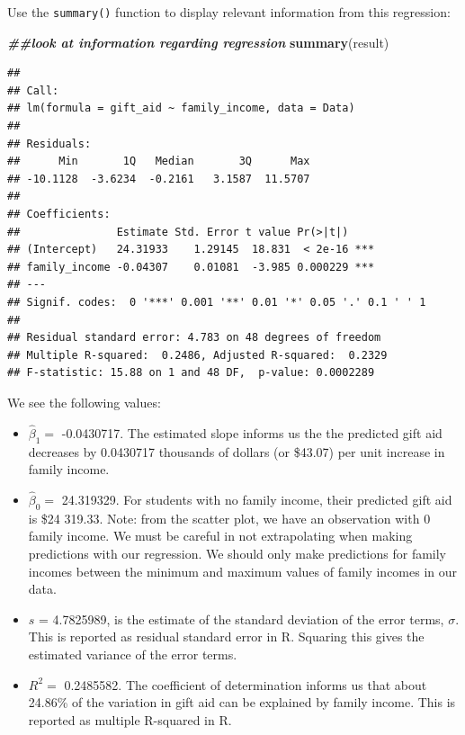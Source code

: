 \documentclass[
]{book}
\newenvironment{Shaded}{\begin{snugshade}}{\end{snugshade}}
\newcommand{\DocumentationTok}[1]{\textcolor[rgb]{0.56,0.35,0.01}{\textbf{\textit{#1}}}}
\newcommand{\FunctionTok}[1]{\textcolor[rgb]{0.13,0.29,0.53}{\textbf{#1}}}
\newcommand{\NormalTok}[1]{#1}
\providecommand{\tightlist}{%
  \setlength{\itemsep}{0pt}\setlength{\parskip}{0pt}}
\begin{document}
Use the \texttt{summary()} function to display relevant information from this regression:

\begin{Shaded}
\begin{Highlighting}[]
\DocumentationTok{\#\#look at information regarding regression}
\FunctionTok{summary}\NormalTok{(result)}
\end{Highlighting}
\end{Shaded}

\begin{verbatim}
## 
## Call:
## lm(formula = gift_aid ~ family_income, data = Data)
## 
## Residuals:
##      Min       1Q   Median       3Q      Max 
## -10.1128  -3.6234  -0.2161   3.1587  11.5707 
## 
## Coefficients:
##               Estimate Std. Error t value Pr(>|t|)    
## (Intercept)   24.31933    1.29145  18.831  < 2e-16 ***
## family_income -0.04307    0.01081  -3.985 0.000229 ***
## ---
## Signif. codes:  0 '***' 0.001 '**' 0.01 '*' 0.05 '.' 0.1 ' ' 1
## 
## Residual standard error: 4.783 on 48 degrees of freedom
## Multiple R-squared:  0.2486, Adjusted R-squared:  0.2329 
## F-statistic: 15.88 on 1 and 48 DF,  p-value: 0.0002289
\end{verbatim}

We see the following values:

\begin{itemize}
\tightlist
\item
  \(\hat{\beta}_1 =\) -0.0430717. The estimated slope informs us the the predicted gift aid decreases by 0.0430717 thousands of dollars (or \$43.07) per unit increase in family income.
\item
  \(\hat{\beta}_0 =\) 24.319329. For students with no family income, their predicted gift aid is \$24 319.33. Note: from the scatter plot, we have an observation with 0 family income. We must be careful in not extrapolating when making predictions with our regression. We should only make predictions for family incomes between the minimum and maximum values of family incomes in our data.
\item
  \(s\) = 4.7825989, is the estimate of the standard deviation of the error terms, \(\sigma\). This is reported as residual standard error in R. Squaring this gives the estimated variance of the error terms.
\item
  \(R^2 =\) 0.2485582. The coefficient of determination informs us that about 24.86\% of the variation in gift aid can be explained by family income. This is reported as multiple R-squared in R.
\end{itemize}
\end{document}
